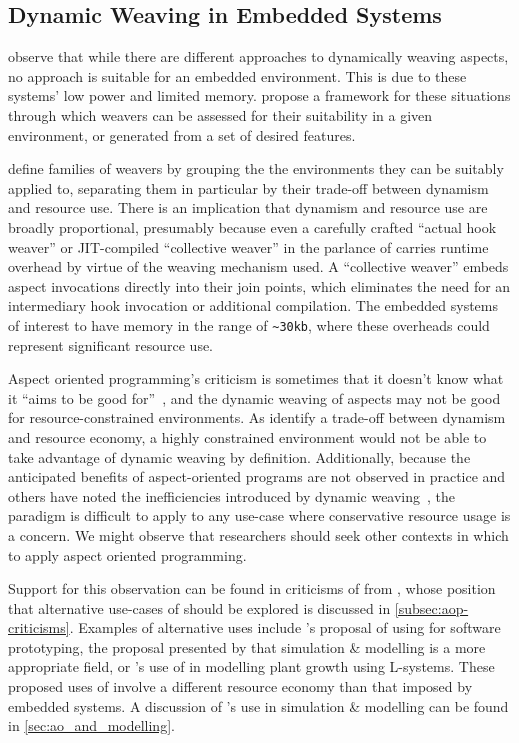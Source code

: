 \subsection{Dynamic Weaving in Embedded Systems}

\citet{gilani2004family} observe that while there are different approaches
to dynamically weaving aspects, no approach is suitable for an embedded
environment. This is due to these systems' low power and
limited memory. \citeauthor{gilani2004family} propose a framework for these
situations through which weavers can be assessed for their suitability in a
given environment, or generated from a set of desired features.

\citeauthor{gilani2004family} define families of weavers by grouping the the
environments they can be suitably applied to, separating them in particular by
their trade-off between dynamism and resource use. There is an implication that
dynamism and resource use are broadly proportional, presumably because even a
carefully crafted ``actual hook weaver'' or JIT-compiled ``collective weaver''
in the parlance of \citet{dynamicAOchitchyan} carries runtime overhead by virtue
of the weaving mechanism used. A ``collective weaver'' embeds aspect invocations
directly into their join points, which eliminates the need for an intermediary
hook invocation or additional compilation. The embedded systems of interest to
\citeauthor{gilani2004family} have memory in the range of \lstinline{~30kb},
where these overheads could represent significant resource use.

Aspect oriented programming's criticism is sometimes that it doesn't know what
it ``aims to be good for''~\cite{steimann06paradoxical}, and the dynamic weaving
of aspects may not be good for resource-constrained environments. As
\citeauthor{gilani2004family} identify a trade-off between dynamism and resource
economy, a highly constrained environment would not be able to take advantage of
dynamic weaving by definition. Additionally, because the anticipated benefits of
aspect-oriented programs are not observed in practice and others have noted the
inefficiencies introduced by dynamic
weaving~\cite{dyerNUmasters,dynamicAOchitchyan}, the paradigm is difficult to
apply to any use-case where conservative resource usage is a concern. We might
observe that researchers should seek other contexts in which to apply aspect
oriented programming.

Support for this observation can be found in criticisms of \aop{} from
\citet{steimann06paradoxical}, whose position that alternative use-cases of
\aspectorientation{} should be explored is discussed in
\cref{subsec:aop-criticisms}. Examples of alternative uses include
\citeauthor{popovici2002PROSE}'s proposal of using \aspectorientation{} for
software prototyping, the proposal presented by \citet{gulyas1999use} that
simulation \& modelling is a more appropriate field, or \citet{Cieslak_2007}'s
use of \aspectorientation{} in modelling plant growth using L-systems. These
proposed uses of \aspectorientation{} involve a different resource economy than
that imposed by embedded systems. A discussion of \aspectorientation{}'s use in
simulation \& modelling can be found in \cref{sec:ao_and_modelling}.


